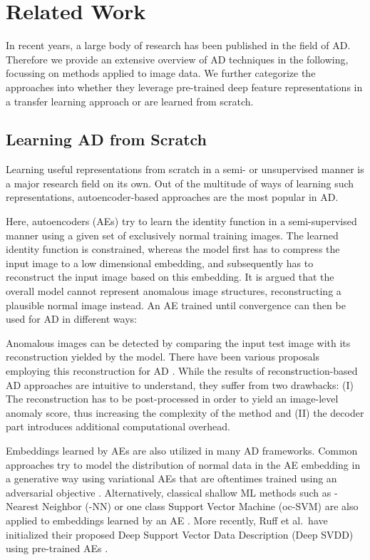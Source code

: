 \documentclass[conference, a4paper]{./template/IEEEtran}
\begin{document}
\section{Related Work}
In recent years, a large body of research has been published in the field of AD.
Therefore we provide an extensive overview of AD techniques in the following, focussing on methods applied to image data.
We further categorize the approaches into whether they leverage pre-trained deep feature representations in a transfer learning approach or are learned from scratch.

\subsection{Learning AD from Scratch}
Learning useful representations from scratch in a semi- or unsupervised manner is a major research field on its own. Out of the multitude of ways of learning such representations, autoencoder-based approaches are the most popular in AD.

Here, autoencoders (AEs) try to learn the identity function in a semi-supervised manner using a given set of exclusively normal training images. The learned identity function is constrained, whereas the model first has to compress the input image to a low dimensional embedding, and subsequently has to reconstruct the input image based on this embedding.
It is argued that the overall model cannot represent anomalous image structures, reconstructing a plausible normal image instead.
An AE trained until convergence can then be used for AD in different ways:

Anomalous images can be detected by comparing the input test image with its reconstruction yielded by the model.
There have been various proposals employing this reconstruction for AD \cite{Bergmann2018, Haselmann2018, Gong2019}.
While the results of reconstruction-based AD approaches are intuitive to understand, they suffer from two drawbacks:
(I) The reconstruction has to be post-processed in order to yield an image-level anomaly score, thus increasing the complexity of the method and (II) the decoder part introduces additional computational overhead.


Embeddings learned by AEs are also utilized in many AD frameworks.
Common approaches try to model the distribution of normal data in the AE embedding in a generative way using variational AEs \cite{Daniel2019} that are oftentimes trained using an adversarial objective \cite{Pidhorskyi2018}.
Alternatively, classical shallow ML methods such as -Nearest Neighbor (-NN) or one class Support Vector Machine (oc-SVM) \cite{Schoelkopf2001} are also applied to embeddings learned by an AE \cite{Sarafijanovic-Djukic2019}.
More recently, Ruff et al.\ have initialized their proposed Deep Support Vector Data Description (Deep SVDD) using pre-trained AEs \cite{Ruff2018, Ruff2020}.
\end{document}
